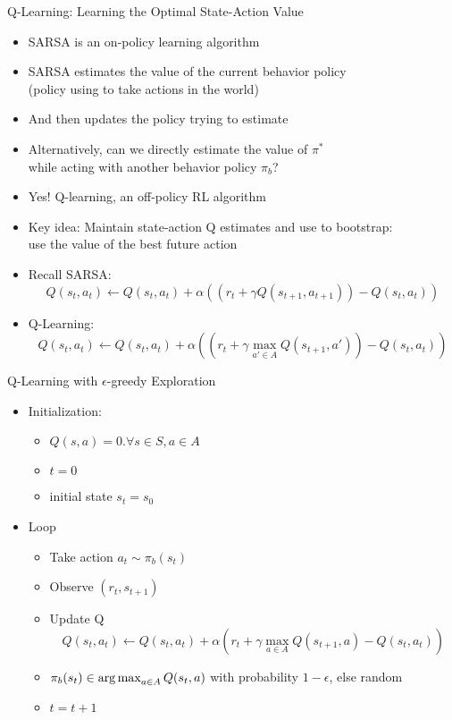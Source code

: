 \documentclass[aspectratio=169]{../latex_main/tntbeamer}  %
\begin{document}
\begin{frame}[c]{Q-Learning: Learning the Optimal State-Action Value}
	
	\vspace{-1em}
	\begin{itemize}
		\item SARSA is an on-policy learning algorithm
		\item SARSA estimates the value of the current behavior policy\\ (policy
		using to take actions in the world)
		\item And then updates the policy trying to estimate
		\pause
		\medskip
		\item Alternatively, can we directly estimate the value of $\pi^*$\\ while acting with another behavior policy $\pi_b$?
		\item Yes! Q-learning, an off-policy RL algorithm
		\item Key idea: Maintain state-action Q estimates and use to bootstrap:\\
		use the value of the best future action
		\item Recall SARSA:
		$$ Q(s_t, a_t) \gets Q(s_t, a_t) + \alpha((r_t + \gamma Q(s_{t+1}, a_{t+1})) - Q(s_t, a_t))$$
		\item Q-Learning:
		$$Q(s_t, a_t) \gets Q(s_t, a_t) + \alpha((r_t + \gamma \max_{a' \in A}Q(s_{t+1},a')) - Q(s_t, a_t)) $$
	\end{itemize}
	
\end{frame}
\begin{frame}[c]{Q-Learning with $\epsilon$-greedy Exploration}
	
	\begin{itemize}
		\item Initialization:
		\begin{itemize}
			\item $Q(s,a)=0. \forall s \in S, a \in A$
			\item $t=0$
			\item initial state $s_t = s_0$
		\end{itemize} 
		\item Loop
		\begin{itemize}
			\item Take action $a_{t} \sim \pi_b(s_{t})$ 
			\item Observe $(r_{t}, s_{t+1})$
			\item Update Q 
			$$Q(s_t,a_t) \gets Q(s_t, a_t) + \alpha (r_t + \gamma \max_{a\in A} Q(s_{t+1}, a) - Q(s_t, a_t))$$
			\item $\pi_b(s_t) \in \operatorname*{arg\,max}_{a\in A} Q(s_t, a)$ with probability $1-\epsilon$, else random
			\item $t = t+1$
		\end{itemize} 
	\end{itemize}
	
\end{frame}
\end{document}

